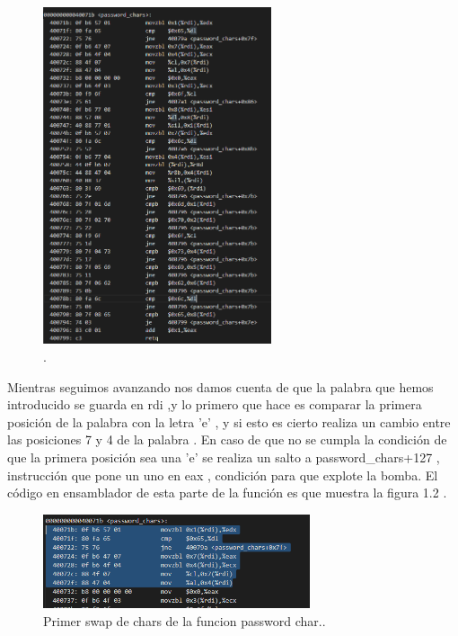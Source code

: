 	\begin{figure}[htb]
		\centering
		\includegraphics[width=0.6\textwidth]{./imagenes/3}
		\caption{.} \label{fig:1}
	\end{figure}
	
	
	Mientras seguimos avanzando nos damos cuenta de que la palabra que hemos introducido se guarda en rdi
	,y lo primero que hace es comparar la primera posición de la palabra 
	con la letra 'e' , y si esto es cierto realiza un cambio entre las posiciones 7 y 4 de la palabra . 
	En caso de que no se cumpla la condición de que la primera posición sea una 'e' se realiza un salto a password\_chars+127 , 
	instrucción que pone un uno en eax , condición para que explote la bomba.
	El código en ensamblador de esta parte de la función es que muestra la figura 1.2 .  
	
	\begin{figure}[htb]
		\centering
		\includegraphics[width=0.7\textwidth]{./imagenes/4}
		\caption{Primer swap de chars de la funcion password char..} \label{fig:1}
	\end{figure}
	
